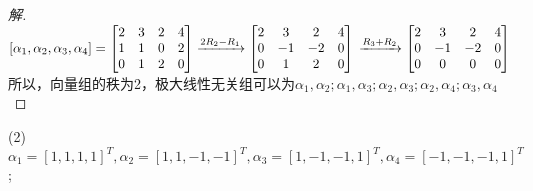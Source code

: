 \documentclass[10pt,a4paper]{report}
\begin{document}
\begin{proof}[解]
	$[\alpha_{1}, \alpha_{2}, \alpha_{3}, \alpha_{4}] = \left[
	\begin{matrix}
	2 & 3 & 2 & 4 \\
	1 & 1 & 0 & 2 \\
	0 & 1 & 2 & 0 
	\end{matrix}
	\right] \xrightarrow{2R_{2}-R_{1}} \left[
	\begin{matrix}
	2 & 3 & 2 & 4 \\
	0 & -1 & -2 & 0 \\
	0 & 1 & 2 & 0 
	\end{matrix}
	\right] \\
	\xrightarrow{R_{3}+R_{2}} 
	\left[
	\begin{matrix}
	2 & 3 & 2 & 4 \\
	0 & -1 & -2 & 0 \\
	0 & 0 & 0 & 0 
	\end{matrix}
	\right]$\\
	所以，向量组的秩为2，极大线性无关组可以为$\alpha_{1}, \alpha_{2};\alpha_{1}, \alpha_{3};\alpha_{2}, \alpha_{3};\alpha_{2}, \alpha_{4};\alpha_{3}, \alpha_{4}$
\end{proof}
\noindent (2)$\alpha_{1}=[1,1,1,1]^{T}, \alpha_{2}=[1,1,-1,-1]^{T}, \alpha_{3}=[1,-1,-1,1]^{T}, \alpha_{4}=[-1,-1,-1,1]^{T}$;
\end{document}

